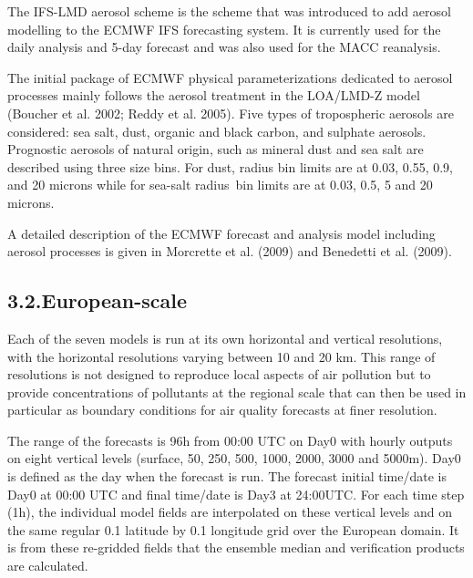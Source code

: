 \documentclass[9pt]{report}
\begin{document}
\noindent{}The IFS-LMD aerosol scheme is the scheme that was introduced to add aerosol modelling to the ECMWF IFS forecasting system. It is currently used for the daily analysis and 5-day forecast and was also used for the MACC reanalysis.%

The initial package of ECMWF physical parameterizations dedicated to aerosol processes mainly follows the aerosol treatment in the LOA/LMD-Z model (Boucher et al. 2002; Reddy et al. 2005). Five types of tropospheric aerosols are considered: sea salt, dust, organic and black carbon, and sulphate aerosols. Prognostic aerosols of natural origin, such as mineral dust and sea salt are described using three size bins. For dust, radius bin limits are at 0.03, 0.55, 0.9, and 20 microns while for sea-salt radius bin limits are at 0.03, 0.5, 5 and 20 microns.%

A detailed description of the ECMWF forecast and analysis model including aerosol processes is given in Morcrette et al. (2009) and Benedetti et al. (2009).%

\subsection{3.2.\hspace*{0.5em}European-scale}\label{sec-european-scale}%

\noindent{}Each of the seven models is run at its own horizontal and vertical resolutions, with the horizontal resolutions varying between 10 and 20 km.
This range of resolutions is not designed to reproduce local aspects of air pollution but to provide concentrations of pollutants at the regional scale that can then be used in particular as boundary conditions for air quality forecasts at finer resolution.%

The range of the forecasts is 96h from 00:00 UTC on Day0 with hourly outputs on eight vertical levels (surface, 50, 250, 500, 1000, 2000, 3000 and 5000m).
Day0 is defined as the day when the forecast is run.
The forecast initial time/date is Day0 at 00:00 UTC and final time/date is Day3 at 24:00UTC.
For each time step (1h), the individual model fields are interpolated on these vertical levels and on the same regular 0.1\textdegree{} latitude by 0.1\textdegree{} longitude grid over the European domain.
It is from these re-gridded fields that the ensemble median and verification products are calculated.%
\end{document}
